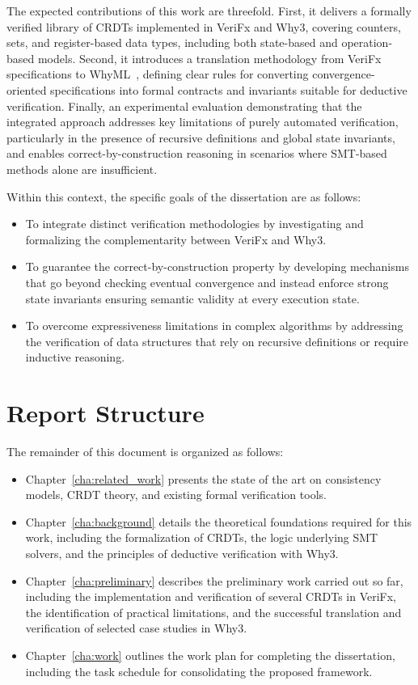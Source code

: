 The expected contributions of this work are threefold. First, it delivers a formally verified library of CRDTs implemented in VeriFx and Why3, covering counters, sets, and register-based data types, including both state-based and operation-based models. Second, it introduces a translation methodology from VeriFx specifications to WhyML~\cite{whyml}, defining clear rules for converting convergence-oriented specifications into formal contracts and invariants suitable for deductive verification. Finally, an experimental evaluation demonstrating that the integrated approach addresses key limitations of purely automated verification, particularly in the presence of recursive definitions and global state invariants, and enables correct-by-construction reasoning in scenarios where SMT-based methods alone are insufficient.

Within this context, the specific goals of the dissertation are as follows:

\begin{itemize}
    \item To integrate distinct verification methodologies by investigating and formalizing the complementarity between VeriFx and Why3.
    \item To guarantee the correct-by-construction property by developing mechanisms that go beyond checking eventual convergence and instead enforce strong state invariants ensuring semantic validity at every execution state.
    \item To overcome expressiveness limitations in complex algorithms by addressing the verification of data structures that rely on recursive definitions or require inductive reasoning.
\end{itemize}

\section{Report Structure}
\label{sec:structure}


The remainder of this document is organized as follows:

\begin{itemize}
    \item Chapter~\ref{cha:related_work} presents the state of the art on consistency models, CRDT theory, and existing formal verification tools.
    \item Chapter~\ref{cha:background} details the theoretical foundations required for this work, including the formalization of CRDTs, the logic underlying SMT solvers, and the principles of deductive verification with Why3.
    \item Chapter~\ref{cha:preliminary} describes the preliminary work carried out so far, including the implementation and verification of several CRDTs in VeriFx, the identification of practical limitations, and the successful translation and verification of selected case studies in Why3.
    \item Chapter~\ref{cha:work} outlines the work plan for completing the dissertation, including the task schedule for consolidating the proposed framework.
\end{itemize}
